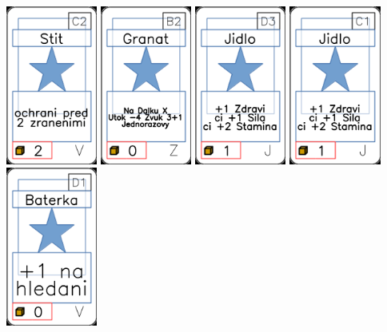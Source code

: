 \documentclass[a4paper]{article}
\begin{document}
	\includegraphics[width=3.0cm]{img-1_71}
	\includegraphics[width=3.0cm]{img-1_96}
	\includegraphics[width=3.0cm]{img-1_17}
	\includegraphics[width=3.0cm]{img-1_10}
	\includegraphics[width=3.0cm]{img-1_75}
\end{document}
